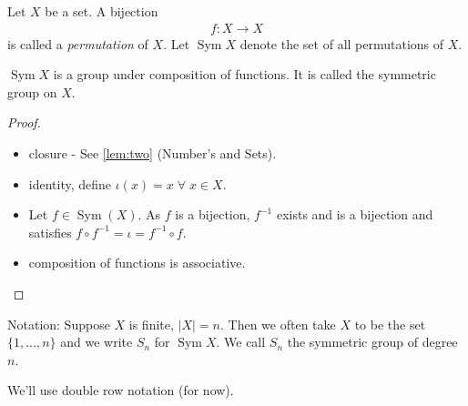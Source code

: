 Let \(X\) be a set.
A bijection \begin{align*}
    f: X \to X
\end{align*} is called a \emph{permutation} of \(X\).
Let \(\operatorname{Sym} X\) denote the set of all permutations of \(X\).

\begin{proposition}
\(\operatorname{Sym} X\) is a group under composition of functions. It is called the symmetric group on \(X\).
\end{proposition}

\begin{proof}

~

\begin{itemize}
\item
  closure - See \ref{lem:two} (Number's and Sets).
\item
  identity, define \(\iota (x) = x \; \forall \; x \in X\).
\item
  Let \(f \in \operatorname{Sym}(X)\).
  As \(f\) is a bijection, \(f^{-1}\) exists and is a bijection and satisfies \(f \circ f^{-1} = \iota = f^{-1} \circ f\).
\item
  composition of functions is associative.
\end{itemize}

\end{proof}

Notation: Suppose \(X\) is finite, \(|X| = n\).
Then we often take \(X\) to be the set \(\{ 1, \ldots, n \}\) and we write \(S_n\) for \(\operatorname{Sym} X\).
We call \(S_n\) the symmetric group of degree \(n\).

We'll use double row notation (for now).

